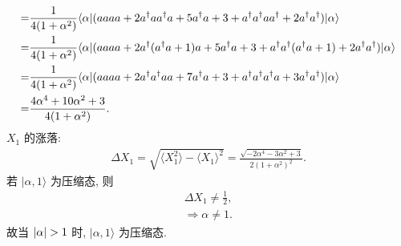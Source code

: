 \documentclass{assignment}
\begin{document}
\begin{pf}
\begin{align}
        \notag=&\frac{1}{4(1+\alpha^2)}\langle\alpha\rvert(aaaa+2a^{\dagger}aa^{\dagger}a+5a^{\dagger}a+3+a^{\dagger}a^{\dagger}aa^{\dagger}+2a^{\dagger}a^{\dagger})\lvert\alpha\rangle\\
        \notag=&\frac{1}{4(1+\alpha^2)}\langle\alpha\rvert(aaaa+2a^{\dagger}(a^{\dagger}a+1)a+5a^{\dagger}a+3+a^{\dagger}a^{\dagger}(a^{\dagger}a+1)+2a^{\dagger}a^{\dagger})\lvert\alpha\rangle\\
        \notag=&\frac{1}{4(1+\alpha^2)}\langle\alpha\rvert(aaaa+2a^{\dagger}a^{\dagger}aa+7a^{\dagger}a+3+a^{\dagger}a^{\dagger}a^{\dagger}a+3a^{\dagger}a^{\dagger})\lvert\alpha\rangle\\
        =&\frac{4\alpha^4+10\alpha^2+3}{4(1+\alpha^2)}.
    \end{align}
    $X_1$ 的涨落:
    \begin{align}
        \Delta X_1=\sqrt{\langle X_1^2\rangle-\langle X_1\rangle^2}=\frac{\sqrt{-2\alpha^4-3\alpha^2+3}}{2(1+\alpha^2)^2}.
    \end{align}
    若 $\lvert\alpha,1\rangle$ 为压缩态, 则
    \begin{gather}
        \Delta X_1\neq\frac{1}{2},\\
        \Longrightarrow\alpha\neq 1.
    \end{gather}
    故当 $\left\lvert\alpha\right\rvert>1$ 时, $\lvert\alpha,1\rangle$ 为压缩态.
\end{pf}
\end{document}
